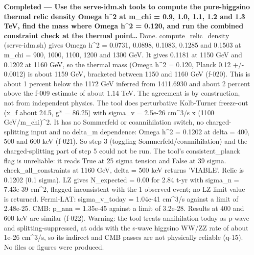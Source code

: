 \documentclass[11pt,a4paper]{article}
\begin{document}
\textbf{Completed --- Use the serve-idm.sh tools to compute the pure-higgsino thermal relic density Omega h\textasciicircum{}2 at m\_chi = 0.9, 1.0, 1.1, 1.2 and 1.3 TeV, find the mass where Omega h\textasciicircum{}2 = 0.120, and run the combined constraint check at the thermal point..} Done. compute\_relic\_density (serve-idm.sh) gives Omega h\textasciicircum{}2 = 0.0731, 0.0898, 0.1083, 0.1285 and 0.1503 at m\_chi = 900, 1000, 1100, 1200 and 1300 GeV. It gives 0.1181 at 1150 GeV and 0.1202 at 1160 GeV, so the thermal mass (Omega h\textasciicircum{}2 = 0.120, Planck 0.12 +/- 0.0012) is about 1159 GeV, bracketed between 1150 and 1160 GeV (f-020). This is about 1 percent below the 1172 GeV inferred from 1411.6930 and about 2 percent above the f-009 estimate of about 1.14 TeV. The agreement is by construction, not from independent physics. The tool does perturbative Kolb-Turner freeze-out (x\_f about 24.5, g* = 86.25) with sigma\_v = 2.5e-26 cm\textasciicircum{}3/s x (1100 GeV/m\_chi)\textasciicircum{}2. It has no Sommerfeld or coannihilation switch, no charged-splitting input and no delta\_m dependence: Omega h\textasciicircum{}2 = 0.1202 at delta = 400, 500 and 600 keV (f-021). So step 3 (toggling Sommerfeld/coannihilation) and the charged-splitting part of step 5 could not be run. The tool's consistent\_planck flag is unreliable: it reads True at 25 sigma tension and False at 39 sigma. check\_all\_constraints at 1160 GeV, delta = 500 keV returns 'VIABLE'. Relic is 0.1202 (0.1 sigma). LZ gives N\_expected = 0.00 for 2.84 t-yr with sigma\_n = 7.43e-39 cm\textasciicircum{}2, flagged inconsistent with the 1 observed event; no LZ limit value is returned. Fermi-LAT: sigma\_v\_today = 1.04e-41 cm\textasciicircum{}3/s against a limit of 2.48e-25. CMB: p\_ann = 1.35e-45 against a limit of 3.2e-28. Results at 400 and 600 keV are similar (f-022). Warning: the tool treats annihilation today as p-wave and splitting-suppressed, at odds with the s-wave higgsino WW/ZZ rate of about 1e-26 cm\textasciicircum{}3/s, so its indirect and CMB passes are not physically reliable (q-15). No files or figures were produced.
\end{document}
